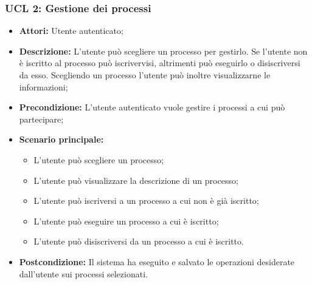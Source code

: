 \subsubsection{UCL 2: Gestione dei processi}
\begin{itemize}
\item \textbf{Attori:} Utente autenticato;
\item \textbf{Descrizione:} L'utente può scegliere un processo per gestirlo.
Se l'utente non è iscritto al processo può iscrivervisi, altrimenti può eseguirlo o disiscriversi da esso.
Scegliendo un processo l'utente può inoltre visualizzarne le informazioni;
\item \textbf{Precondizione:} L'utente autenticato vuole gestire i processi a cui può partecipare;
\item \textbf{Scenario principale:}
\begin{itemize}
\item L'utente può scegliere un processo;
\item L'utente può visualizzare la descrizione di un processo;
\item L'utente può iscriversi a un processo a cui non è già iscritto;
\item L'utente può eseguire un processo a cui è iscritto;
\item L'utente può disiscriversi da un processo a cui è iscritto.
\end{itemize}
\item \textbf{Postcondizione:} Il sistema ha eseguito e salvato le operazioni desiderate dall'utente sui processi selezionati.
\end{itemize}

\hypertarget{L2.1}{}
